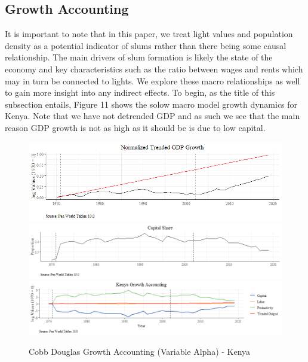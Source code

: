 \subsection{Growth Accounting}

It is important to note that in this paper, we treat light values and population density as a potential indicator of slums rather than there being some causal relationship. The main drivers of slum formation is likely the state of the economy and key characteristics such as the ratio between wages and rents which may in turn be connected to lights. We explore these macro relationships as well to gain more insight into any indirect effects. To begin, as the title of this subsection entails, Figure 11 shows the solow macro model growth dynamics for Kenya. Note that we have not detrended GDP and as such we see that the main reason GDP growth is not as high as it should be is due to low capital.

\begin{figure}
    \centering
    \includegraphics[scale = 0.7]{Graphics/Normalized Trended GDP Growth.png}
    \includegraphics[scale = 0.52]{Graphics/Capital Share.png}
    \includegraphics[scale = 0.52]{Graphics/Kenya Growth Accounting.png}
    \caption{Cobb Douglas Growth Accounting (Variable Alpha) - Kenya}
    \label{fig:KenyaGrowthAccounting}
\end{figure}

